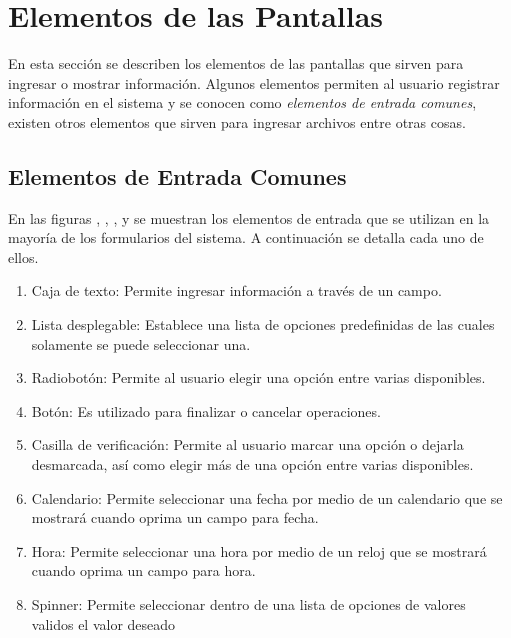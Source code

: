 \section{Elementos de las Pantallas}
En esta sección se describen los elementos de las pantallas que sirven para ingresar o mostrar información. Algunos elementos permiten al usuario registrar información en el sistema y se conocen como \emph{elementos de entrada comunes}, existen otros elementos que sirven para ingresar archivos entre otras cosas.

\subsection{Elementos de Entrada Comunes}
En las figuras ,  ,  ,  y  se muestran los elementos de entrada que se utilizan en la mayoría de los formularios del sistema. A continuación se detalla cada uno de ellos.

\begin{enumerate}
 \item Caja de texto: Permite ingresar información a través de un campo.
 \item Lista desplegable: Establece una lista de opciones predefinidas de las cuales solamente se puede seleccionar una.
 \item Radiobotón: Permite al usuario elegir una opción entre varias disponibles.
 \item Botón: Es utilizado para finalizar o cancelar operaciones.
 \item Casilla de verificación: Permite al usuario marcar una opción o dejarla desmarcada, así como elegir más de una opción entre varias disponibles.
 \item Calendario: Permite seleccionar una fecha por medio de un calendario que se mostrará cuando oprima un campo para fecha.
 \item Hora: Permite seleccionar una hora por medio de un reloj que se mostrará cuando oprima un campo para hora.
 \item Spinner: Permite seleccionar dentro de una lista de opciones de valores validos el valor deseado 
\end{enumerate}


